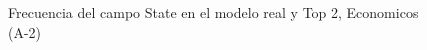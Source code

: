 \begin{figure}[H]
    \centering
    
    \caption{Frecuencia del campo State en el modelo real y Top 2, Economicos (A-2)}
    \label{frecuency-State-top2}
\end{figure}